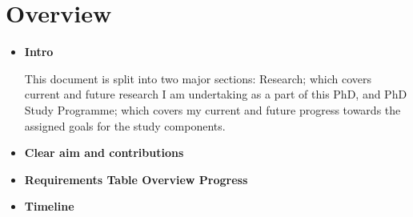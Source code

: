 \section{Overview}

\begin{itemize}
    \item \textbf{Intro}

    This document is split into two major sections: Research; which covers current and future research I am undertaking as a part of this PhD, and PhD Study Programme; which covers my current and future progress towards the assigned goals for the study components.
    
    \item \textbf{Clear aim and contributions}

    \item \textbf{Requirements Table Overview Progress}
    \item \textbf{Timeline}
\end{itemize}